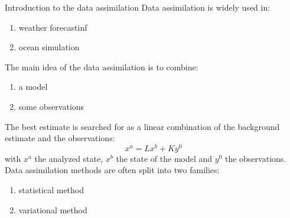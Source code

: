 \begin{frame}{Introduction to the data assimilation}
 Data assimilation is widely used in:
 \begin{enumerate}[\textbullet]
		\item weather forecastinf
		\item ocean simulation
 \end{enumerate}	 
   	The main idea of the data assimilation is to combine:
 \begin{enumerate}[\textbullet]
		\item a model
		\item some observations
 \end{enumerate}	 
 The best estimate is searched for as a linear combination of the background estimate and the observations:
 $$x^a=Lx^b+Ky^0$$
 with $x^a$ the analyzed state, $x^b$ the state of the model and $y^0$ the observations.
 Data assimilation methods are often split into two families:
 \begin{enumerate}[\textbullet]
		\item statistical method
		\item variational method
   	\end{enumerate}
\end{frame}
